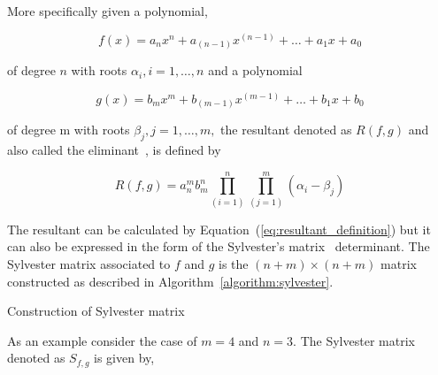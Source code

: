More specifically given a polynomial,

\[ f(x) = a_n x^n + a_{(n-1)} x ^{(n-1)} + \dots +a_1 x + a_0 \]

of degree \(n\) with roots \(\alpha_i, i=1, \dots, n\) and a polynomial

\[ g(x) = b_m x ^m + b_{(m-1)} x^{(m-1)} + \dots + b_1 x + b_0 \]

of degree m with roots \(\beta_j, j=1, \dots , m,\) the resultant denoted as \(R(f, g)\)
and also called the eliminant~\cite{Salmon1924}, is defined by

\begin{equation}\label{eq:resultant_definition}
R(f, g) = a_n^m b_m^n \prod_{(i=1)}^n \prod_{(j=1)}^m ( \alpha_i - \beta_j)
\end{equation}

The resultant can be calculated by Equation~(\ref{eq:resultant_definition}) but
it can also be expressed in the form of the Sylvester's
matrix~\cite{Akritas2014} determinant. The Sylvester matrix associated to
\(f\) and \(g\) is the \((n + m) \times (n + m)\)
matrix constructed as described in Algorithm~\ref{algorithm:sylvester}.

\begin{algorithm}[H]
\caption{Construction of Sylvester matrix~\cite{Akritas2014}}\label{algorithm:sylvester}
\end{algorithm}

As an example consider the case of \(m = 4\) and \(n = 3\). The Sylvester matrix
denoted as \(S_{f,g}\) is given by,

